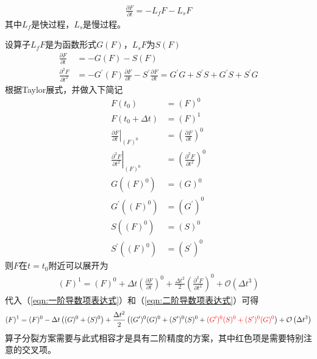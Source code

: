\documentclass{ctexart}
\begin{document}
\begin{align}
  \frac{\partial F}{\partial t} = - L_f F - L_s F
\end{align}
其中$L_f$是快过程，$L_s$是慢过程。

设算子$L_f F$是为函数形式$G(F)$，$L_s F$为$S(F)$
\begin{align}
  \frac{\partial F}{\partial t} & = - G(F) - S(F) \label{eqn:一阶导数项表达式} \\
  \frac{\partial^2 F}{\partial t^2} & = - G^\prime(F) \frac{\partial F}{\partial t} - S^\prime \frac{\partial F}{\partial t} = G^\prime G + S^\prime S + G^\prime S + S^\prime G \label{eqn:二阶导数项表达式}
\end{align}
根据Taylor展式，并做入下简记
\begin{align*}
  F(t_0) & = (F)^0 \\
  F(t_0 + \Delta{t}) & = (F)^1 \\
  \left. \frac{\partial F}{\partial t} \right|_{(F)^0} & = \left( \frac{\partial F}{\partial t} \right)^0 \\
  \left. \frac{\partial^2 F}{\partial t^2} \right|_{(F)^0} & = \left( \frac{\partial^2 F}{\partial t^2} \right)^0 \\
  G((F)^0) & = (G)^0 \\
  G^\prime((F)^0) & = (G^\prime)^0 \\
  S((F)^0) & = (S)^0 \\
  S^\prime((F)^0) & = (S^\prime)^0
\end{align*}
则$F$在$t = t_0$附近可以展开为
\begin{align}
  (F)^1 = (F)^0 + \Delta{t} \left( \frac{\partial F}{\partial t} \right)^0 + \frac{\Delta{t}^2}{2} \left( \frac{\partial^2 F}{\partial t^2} \right)^0 + \mathcal{O} \left( \Delta{t}^3 \right)
\end{align}
代入（\ref{eqn:一阶导数项表达式}）和（\ref{eqn:二阶导数项表达式}）可得
\begin{align}
  (F)^1 = (F)^0 - \Delta{t} \left( (G)^0 + (S)^0 \right) + \frac{\Delta{t}^2}{2} \left( (G^\prime)^0 (G)^0 + (S^\prime)^0 (S)^0 + {\color{red} (G^\prime)^0 (S)^0 + (S^\prime)^0 (G)^0} \right) + \mathcal{O} \left( \Delta{t}^3 \right) \label{eqn:算子分裂等式}
\end{align}
算子分裂方案需要与此式相容才是具有二阶精度的方案，其中红色项是需要特别注意的交叉项。
\end{document}
